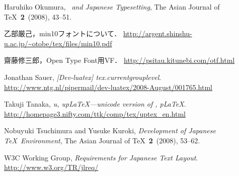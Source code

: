 \documentclass{ajt}
\begin{document}
\begin{thebibliography}{99}
Haruhiko Okumura, \emph{\pTeX\ and Japanese Typesetting},
	The Asian Journal of \TeX\ \textbf{2}~(2008), 43--51.

乙部厳己，min10フォントについて．
\url{http://argent.shinshu-u.ac.jp/~otobe/tex/files/min10.pdf}

齋藤修三郎，Open Type Font用VF．
\url{http://psitau.kitunebi.com/otf.html}

Jonathan Sauer, \emph{[Dev-luatex] tex.currentgrouplevel}. 
\url{http://www.ntg.nl/pipermail/dev-luatex/2008-August/001765.html}

Takuji Tanaka, \emph{u\pTeX, up\LaTeX---unicode version of \pTeX, p\LaTeX}.
\url{http://homepage3.nifty.com/ttk/comp/tex/uptex_en.html}

Nobuyuki Tsuchimura and Yusuke Kuroki, \emph{Development of Japanese \TeX\ Environment},
	The Asian Journal of \TeX\ \textbf{2}~(2008), 53--62.

W3C Working Group, \emph{Requirements for Japanese Text Layout}. 
\url{http://www.w3.org/TR/jlreq/}
\end{thebibliography}
\end{document}
